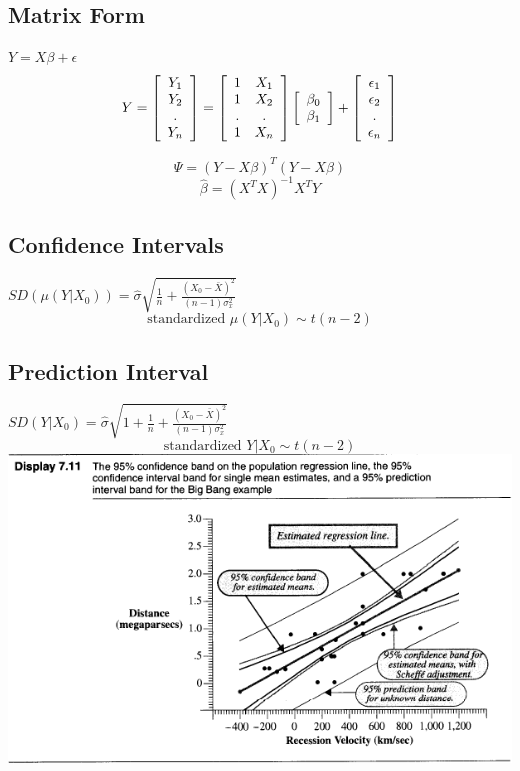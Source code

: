 \documentclass[10pt,landscape, fleqn]{article}
\begin{document}
\begin{multicols}{3}
			\subsection{Matrix Form}
				$ Y = X\beta + \epsilon $
				\[ Y = \left[ 
						\begin{array}{c}
							Y_1\\ Y_2 \\ . \\ Y_n
						\end{array}
						\right]  = \left[
						\begin{array}{c c}
							1 & X_1 \\
							1 & X_2 \\
							. & . \\
							1 & X_n \\
						\end{array}
						\right]\left[
							\begin{array}{c}
								\beta_0\\
								\beta_1
							\end{array}
						\right] + \left[
							\begin{array}{c}
								\epsilon_1 \\
								\epsilon_2 \\
								. \\
								\epsilon_n
							\end{array}
						\right]
				\]

				\[\Psi = (Y-X\beta)^T(Y-X\beta) \]
				\[ \hat{\beta} = (X^TX)^{-1}X^TY \]
			\subsection{Confidence Intervals}
				$ SD(\mu(Y|X_0)) = \hat{\sigma}\sqrt{\frac{1}{n} + \frac{(X_0-\bar{X})^2}{(n-1)\sigma_x^2}} $
				\[ \mbox{standardized } \mu(Y|X_0) \sim t(n-2)\]
			\subsection{Prediction Interval}
				$ SD(Y|X_0) = \hat{\sigma}\sqrt{1+\frac{1}{n} + \frac{(X_0-\bar{X})^2}{(n-1)\sigma_x^2}} $
				\[ \mbox{standardized } Y|X_0 \sim t(n-2)\]
			\includegraphics[width=0.95\linewidth]{slr3}

\end{multicols}
\end{document}
